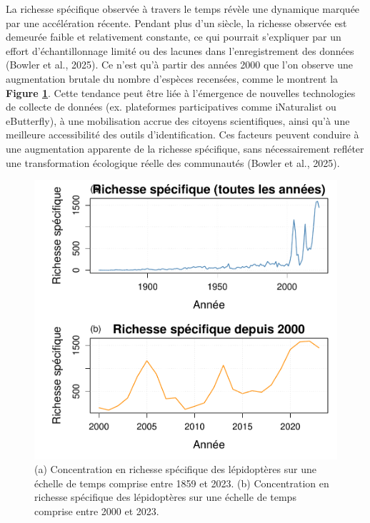 \documentclass[9pt,twocolumn,twoside,]{pnas-new}
\begin{document}
La richesse spécifique observée à travers le temps révèle une dynamique
marquée par une accélération récente. Pendant plus d'un siècle, la
richesse observée est demeurée faible et relativement constante, ce qui
pourrait s'expliquer par un effort d'échantillonnage limité ou des
lacunes dans l'enregistrement des données (Bowler et al., 2025). Ce
n'est qu'à partir des années 2000 que l'on observe une augmentation
brutale du nombre d'espèces recensées, comme le montrent la
\textbf{Figure \ref{fig:fig_richesse_temporelle}}. Cette tendance peut
être liée à l'émergence de nouvelles technologies de collecte de données
(ex. plateformes participatives comme iNaturalist ou eButterfly), à une
mobilisation accrue des citoyens scientifiques, ainsi qu'à une meilleure
accessibilité des outils d'identification. Ces facteurs peuvent conduire
à une augmentation apparente de la richesse spécifique, sans
nécessairement refléter une transformation écologique réelle des
communautés (Bowler et al., 2025).

\begin{figure}[H]

{\centering \includegraphics[width=0.8\linewidth]{rapport_final_BIO500_files/figure-latex/fig_richesse_temporelle-1} 

}

\caption{\label{fig:fig_richesse_temporelle}(a) Concentration en richesse spécifique des lépidoptères sur une échelle de temps comprise entre 1859 et 2023. (b) Concentration en richesse spécifique des lépidoptères sur une échelle de temps comprise entre 2000 et 2023.}\label{fig:fig_richesse_temporelle}
\end{figure}
\end{document}
